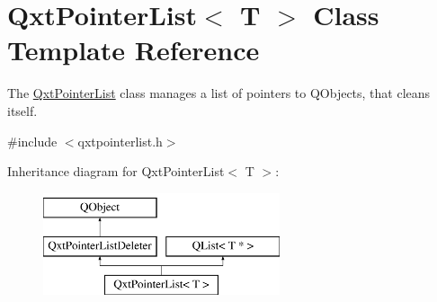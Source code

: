 \hypertarget{class_qxt_pointer_list}{\section{Qxt\-Pointer\-List$<$ T $>$ Class Template Reference}
\label{class_qxt_pointer_list}
}


The \hyperlink{class_qxt_pointer_list}{Qxt\-Pointer\-List} class manages a list of pointers to Q\-Objects, that cleans itself.  




{\ttfamily \#include $<$qxtpointerlist.\-h$>$}

Inheritance diagram for Qxt\-Pointer\-List$<$ T $>$\-:\begin{figure}[H]
\begin{center}
\leavevmode
\includegraphics[height=3.000000cm]{class_qxt_pointer_list}
\end{center}
\end{figure}

